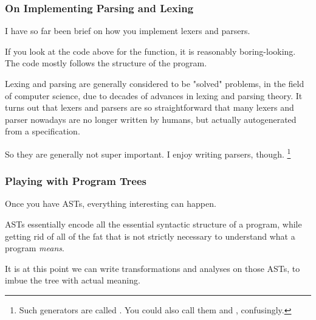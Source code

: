 \documentclass[aspectratio=169]{beamer}
\begin{document}
\begin{frame}[fragile]
  \frametitle{On Implementing Parsing and Lexing}

  I have so far been brief on how you implement lexers and parsers.

  \pause
  \vspace{\fill}

  If you look at the code above for the  function, it is
  reasonably boring-looking. The code mostly follows the structure of
  the program.

  \pause
  \vspace{\fill}

  Lexing and parsing are generally considered to be "solved" problems, in the
  field of computer science, due to decades of advances in lexing and parsing
  theory. It turns out that lexers and parsers are so straightforward that many
  lexers and parser nowadays are no longer written by humans, but actually
  autogenerated from a specification.

  \pause
  \vspace{\fill}

  So they are generally not super important. I enjoy writing parsers, though.
  \footnote{Such generators are called .
  You could also call them  and ,
  confusingly.}
\end{frame}

\begin{frame}[fragile]
  \frametitle{Playing with Program Trees}

  Once you have ASTs, everything interesting can happen.

  \pause
  \vspace{\fill}

  ASTs essentially encode all the essential syntactic structure of a program,
  while getting rid of all of the fat that is not strictly necessary to understand
  what a program \textit{means}.

  \pause
  \vspace{\fill}

  It is at this point we can write transformations and analyses on those ASTs,
  to imbue the tree with actual meaning.

  \pause
  \vspace{\fill}

\end{frame}
\end{document}
